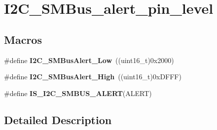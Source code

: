 \hypertarget{group___i2_c___s_m_bus__alert__pin__level}{\section{I2\-C\-\_\-\-S\-M\-Bus\-\_\-alert\-\_\-pin\-\_\-level}
\label{group___i2_c___s_m_bus__alert__pin__level}
}
\subsection*{Macros}
\begin{DoxyCompactItemize}
\item 
\hypertarget{group___i2_c___s_m_bus__alert__pin__level_ga6f923166107afb8aad1d7d1a87048d6e}{\#define {\bfseries I2\-C\-\_\-\-S\-M\-Bus\-Alert\-\_\-\-Low}~((uint16\-\_\-t)0x2000)}\label{group___i2_c___s_m_bus__alert__pin__level_ga6f923166107afb8aad1d7d1a87048d6e}

\item 
\hypertarget{group___i2_c___s_m_bus__alert__pin__level_gac3ab64f43ef90f0f83f9c88981aaa862}{\#define {\bfseries I2\-C\-\_\-\-S\-M\-Bus\-Alert\-\_\-\-High}~((uint16\-\_\-t)0x\-D\-F\-F\-F)}\label{group___i2_c___s_m_bus__alert__pin__level_gac3ab64f43ef90f0f83f9c88981aaa862}

\item 
\#define {\bfseries I\-S\-\_\-\-I2\-C\-\_\-\-S\-M\-B\-U\-S\-\_\-\-A\-L\-E\-R\-T}(A\-L\-E\-R\-T)
\end{DoxyCompactItemize}


\subsection{Detailed Description}



